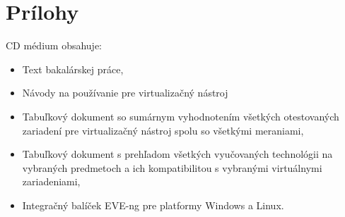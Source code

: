 \chapter*{Prílohy}

CD médium obsahuje:

\begin{itemize}
    \item Text bakalárskej práce,
    \item Návody na používanie pre virtualizačný nástroj
    \item Tabuľkový dokument so sumárnym vyhodnotením všetkých otestovaných zariadení pre virtualizačný nástroj spolu so všetkými meraniami,
    \item Tabuľkový dokument s prehľadom všetkých vyučovaných technológii na vybraných predmetoch a ich kompatibilitou s vybranými virtuálnymi zariadeniami,
    \item Integračný balíček EVE-ng pre platformy Windows a Linux.
\end{itemize}
